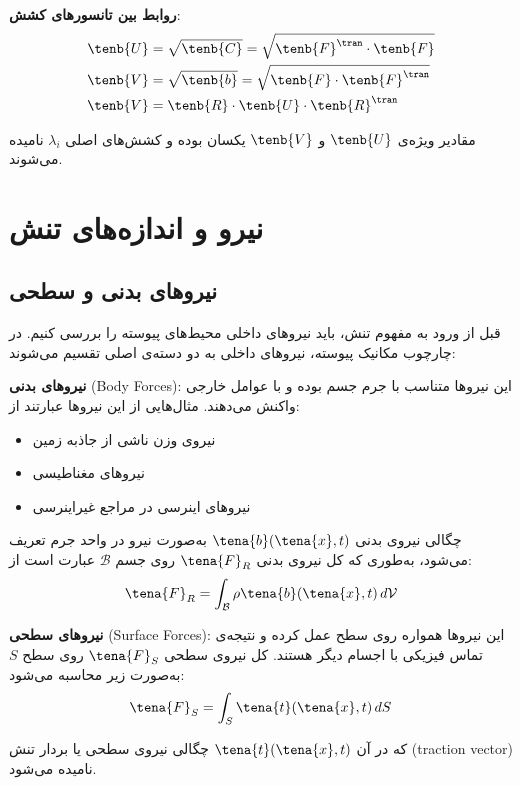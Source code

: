 \textbf{روابط بین تانسورهای کشش}:
\begin{align}
	\tenb{U} & = \sqrt{\tenb{C}} = \sqrt{\tenb{F}^\tran \cdot \tenb{F}} \\
	\tenb{V} & = \sqrt{\tenb{b}} = \sqrt{\tenb{F} \cdot \tenb{F}^\tran} \\
	\tenb{V} & = \tenb{R} \cdot \tenb{U} \cdot \tenb{R}^\tran
\end{align}

مقادیر ویژه‌ی $\tenb{U}$ و $\tenb{V}$ یکسان بوده و کشش‌های اصلی $\lambda_i$ نامیده می‌شوند.

\section{نیرو و اندازه‌های تنش}

\subsection{نیروهای بدنی و سطحی}

قبل از ورود به مفهوم تنش، باید نیروهای داخلی محیط‌های پیوسته را بررسی کنیم. در چارچوب مکانیک پیوسته، نیروهای داخلی به دو دسته‌ی اصلی تقسیم می‌شوند:

\textbf{نیروهای بدنی} (Body Forces): این نیروها متناسب با جرم جسم بوده و با عوامل خارجی واکنش می‌دهند. مثال‌هایی از این نیروها عبارتند از:
\begin{itemize}
	\item نیروی وزن ناشی از جاذبه زمین
	\item نیروهای مغناطیسی
	\item نیروهای اینرسی در مراجع غیراینرسی
\end{itemize}

چگالی نیروی بدنی $\tena{b}(\tena{x}, t)$ به‌صورت نیرو در واحد جرم تعریف می‌شود، به‌طوری که کل نیروی بدنی $\tena{F}_R$ روی جسم $\mathcal{B}$ عبارت است از:
\begin{equation}
	\tena{F}_R = \int_{\mathcal{B}} \rho \tena{b}(\tena{x}, t) \, d\mathcal{V}
\end{equation}

\textbf{نیروهای سطحی} (Surface Forces): این نیروها همواره روی سطح عمل کرده و نتیجه‌ی تماس فیزیکی با اجسام دیگر هستند. کل نیروی سطحی $\tena{F}_S$ روی سطح $S$ به‌صورت زیر محاسبه می‌شود:
\begin{equation}
	\tena{F}_S = \int_{S} \tena{t}(\tena{x}, t) \, dS
\end{equation}

که در آن $\tena{t}(\tena{x}, t)$ چگالی نیروی سطحی یا بردار تنش (traction vector) نامیده می‌شود.

